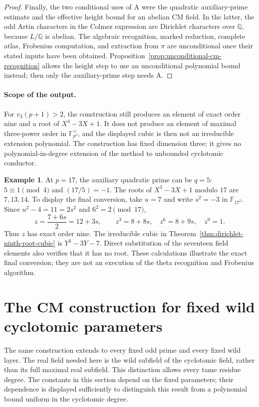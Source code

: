\documentclass[11pt]{article}
\theoremstyle{definition}
\newtheorem{example}[theorem]{Example}
\theoremstyle{remark}
\begin{document}
\begin{proof}
Finally, the two conditional uses of \(\mathrm A\) were the
quadratic auxiliary-prime estimate and the effective height
bound for an abelian CM field. In the latter, the odd Artin
characters in the Colmez expression are Dirichlet characters over
\(\mathbb Q\), because \(L/\mathbb Q\) is abelian. The algebraic
recognition, marked reduction, complete atlas, Frobenius
computation, and extraction from \(\pi\) are unconditional
once their stated inputs have been obtained. Proposition~\ref{prop:unconditional-cm-recognition}
allows the height step to use an unconditional polynomial bound instead;
then only the auxiliary-prime step needs \(\mathrm A\).
\end{proof}

\paragraph{Scope of the output.}
For \(v_3(p+1)>2\), the construction still produces an element
of exact order nine and a root of \(X^3-3X+1\). It does not
produce an element of maximal three-power order in
\(\mathbb F_{p^2}^{\times}\), and the displayed cubic is then
not an irreducible extension polynomial. The construction has
fixed dimension three; it gives no polynomial-in-degree
extension of the method to unbounded cyclotomic conductor.


\begin{example}\label{ex:sextic-cm-seventeen}
At \(p=17\), the auxiliary quadratic prime can be \(q=5\):
\(5\equiv1\pmod4\) and \((17/5)=-1\).
The roots of \(X^3-3X+1\) modulo \(17\) are \(7,13,14\).
To display the final conversion, take \(u=7\) and write
\(s^2=-3\) in \(\mathbb F_{17^2}\). Since
\(u^2-4=11=2s^2\) and \(6^2=2\pmod{17}\),
\[
 z=\frac{7+6s}{2}=12+3s,\qquad
 z^3=8+8s,\quad z^6=8+9s,\quad z^9=1.
\]
Thus \(z\) has exact order nine. The irreducible cubic in
Theorem~\ref{thm:dirichlet-ninth-root-cubic} is
\(Y^3-3Y-7\). Direct substitution of the seventeen field elements
also verifies that it has no root. These calculations illustrate the
exact final conversion; they are not an execution of the theta
recognition and Frobenius algorithm.
\end{example}

\section{The CM construction for fixed wild cyclotomic parameters}
\label{sec:fixed-wild-cm}

The same construction extends to every fixed odd prime and every
fixed wild layer. The real field needed here is the wild subfield
of the cyclotomic field, rather than its full maximal real
subfield. This distinction allows every tame residue degree.
The constants in this section depend on the fixed parameters;
their dependence is displayed sufficiently to distinguish this
result from a polynomial bound uniform in the cyclotomic degree.
\end{document}
